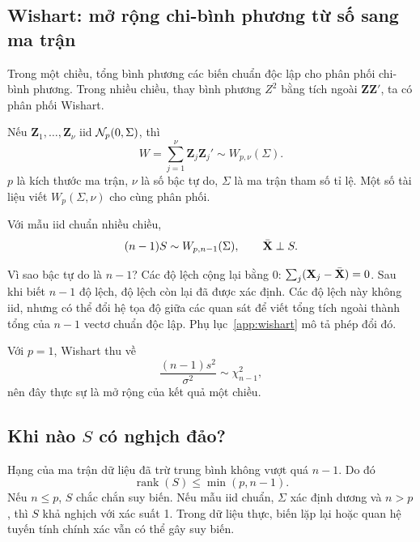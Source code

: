 \subsection{Wishart: mở rộng chi-bình phương từ số sang ma trận}
Trong một chiều, tổng bình phương các biến chuẩn độc lập cho phân phối
chi-bình phương. Trong nhiều chiều, thay bình phương $Z^2$ bằng tích ngoài
$\mathbf Z\mathbf Z'$, ta có phân phối Wishart.

\begin{definition}
Nếu $\mathbf Z_1,\ldots,\mathbf Z_\nu$ iid $\mathcal N_p(0,\Sigma)$, thì
\[
 W=\sum_{j=1}^\nu\mathbf Z_j\mathbf Z_j'
 \sim W_{p,\nu}(\Sigma).
\]
$p$ là kích thước ma trận, $\nu$ là số bậc tự do, $\Sigma$ là ma trận
tham số tỉ lệ. Một số tài liệu viết $W_p(\Sigma,\nu)$ cho cùng phân phối.
\end{definition}

\begin{result}
Với mẫu iid chuẩn nhiều chiều,
\begin{equation}
 (n-1)S\sim W_{p,n-1}(\Sigma),\qquad \bar{\mathbf X}\perp S.
 \label{eq:wishart}
\end{equation}
\end{result}


Vì sao bậc tự do là $n-1$? Các độ lệch cộng lại bằng 0:
$\sum_j(\mathbf X_j-\bar{\mathbf X})=0$. Sau khi biết $n-1$ độ lệch, độ lệch còn
lại đã được xác định. Các độ lệch này không iid, nhưng có thể đổi hệ tọa độ
giữa các quan sát để viết tổng tích ngoài thành tổng của $n-1$ vectơ chuẩn
độc lập. Phụ lục~\ref{app:wishart} mô tả phép đổi đó.

Với $p=1$, Wishart thu về
\[
 \frac{(n-1)s^2}{\sigma^2}\sim\chi^2_{n-1},
\]
nên đây thực sự là mở rộng của kết quả một chiều.

\subsection{Khi nào \texorpdfstring{$S$}{S} có nghịch đảo?}
Hạng của ma trận dữ liệu đã trừ trung bình không vượt quá $n-1$. Do đó
\[
 \operatorname{rank}(S)\le\min(p,n-1).
\]
Nếu $n\le p$, $S$ chắc chắn suy biến. Nếu mẫu iid chuẩn, $\Sigma$ xác định
dương và $n>p$, thì $S$ khả nghịch với xác suất 1. Trong dữ liệu thực,
biến lặp lại hoặc quan hệ tuyến tính chính xác vẫn có thể gây suy biến.

